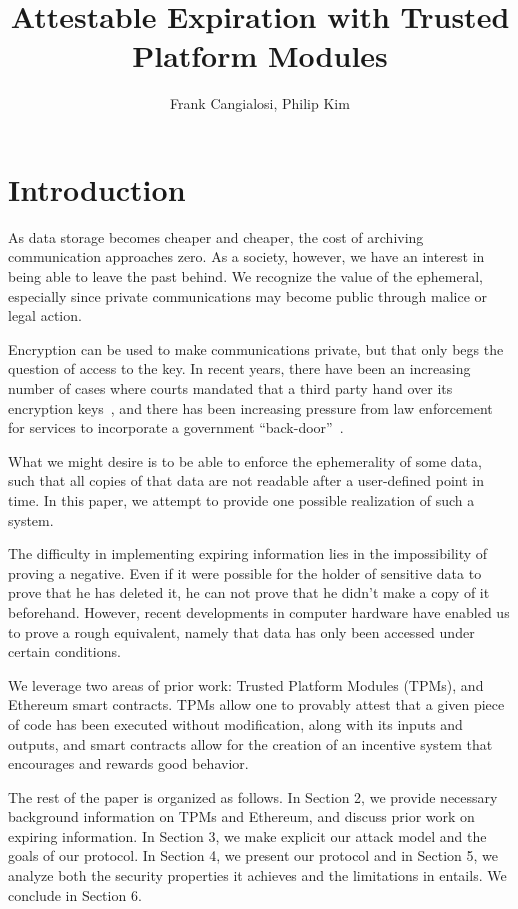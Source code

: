 \documentclass{article}
\begin{document}
\title{Attestable Expiration with Trusted Platform Modules}
\author{Frank Cangialosi, Philip Kim}

\maketitle

\section{Introduction}

As data storage becomes cheaper and cheaper, the cost of archiving communication approaches zero. As a society, however, we have an interest in being able to leave the past behind. We recognize the value of the ephemeral, especially since private communications may become public through malice or legal action.

Encryption can be used to make communications private, but that only begs the question of access to the key. In recent years, there have been an increasing number of cases where courts mandated that a third party hand over its encryption keys~\cite{hushmail}, and there has been increasing pressure from law enforcement for services to incorporate a government ``back-door''~\cite{backdoor}.

What we might desire is to be able to enforce the ephemerality of some data, such that all copies of that data are not readable after a user-defined point in time. In this paper, we attempt to provide one possible realization of such a system.

The difficulty in implementing expiring information lies in the impossibility of proving a negative. Even if it were possible for the holder of sensitive data to prove that he has deleted it, he can not prove that he didn't make a copy of it beforehand. However, recent developments in computer hardware have enabled us to prove a rough equivalent, namely that data has only been accessed under certain conditions.

We leverage two areas of prior work: Trusted Platform Modules (TPMs), and Ethereum smart contracts. TPMs allow one to provably attest that a given piece of code has been executed without modification, along with its inputs and outputs, and smart contracts allow for the creation of an incentive system that encourages and rewards good behavior.

The rest of the paper is organized as follows. In Section 2, we provide necessary background information on TPMs and Ethereum, and discuss prior work on expiring information. In Section 3, we make explicit our attack model and the goals of our protocol. In Section 4, we present our protocol and in Section 5, we analyze both the security properties it achieves and the limitations in entails. We conclude in Section 6.
\end{document}
